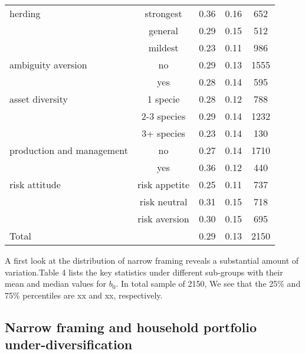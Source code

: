 \documentclass[ukenglish,nottitlepage,thmsb,11pt,letterpaper]{article}
\begin{document}
\begin{spacing}{1}
\begin{table}[H]
\begin{tabular*}{\textwidth}{l @{\extracolsep{\fill}} cccc}
		\midrule
		herding
		&strongest  &0.36	&0.16	&652  \\
		&general    &0.29	&0.15	&512  \\
		&mildest    &0.23	&0.11	&986  \\
		\midrule
		ambiguity aversion	
		&no   &0.29	&0.13	&1555 \\
		&yes  &0.28	&0.14	&595  \\
		\midrule
		asset diversity
		&1 specie         &0.28	&0.12	&788   \\
		&2-3 species      &0.29	&0.14	&1232  \\
		&3+ species       &0.23	&0.14	&130   \\
		\midrule
		production and management
		&no  &0.27	&0.14	&1710  \\
		&yes &0.36	&0.12	&440   \\
		\midrule
		risk attitude 
		&risk appetite  &0.25	&0.11	&737  \\
		&risk neutral   &0.31	&0.15	&718  \\
		&risk aversion  &0.30	&0.15	&695  \\
		\midrule
    	Total	
	       &   	    &0.29	&0.13		&2150 \\
	
		\bottomrule
	\end{tabular*}%
\end{table}%
\end{spacing}
A first look at the distribution of narrow framing reveals a substantial amount of variation.Table 4 lists the key statistics under different sub-groups with their mean and median values for $b_0$. In total sample of 2150, We see that the 25\% and 75\% percentiles are xx and xx, respectively.   

 
\subsection{Narrow framing and household portfolio under-diversification}
\end{document}
